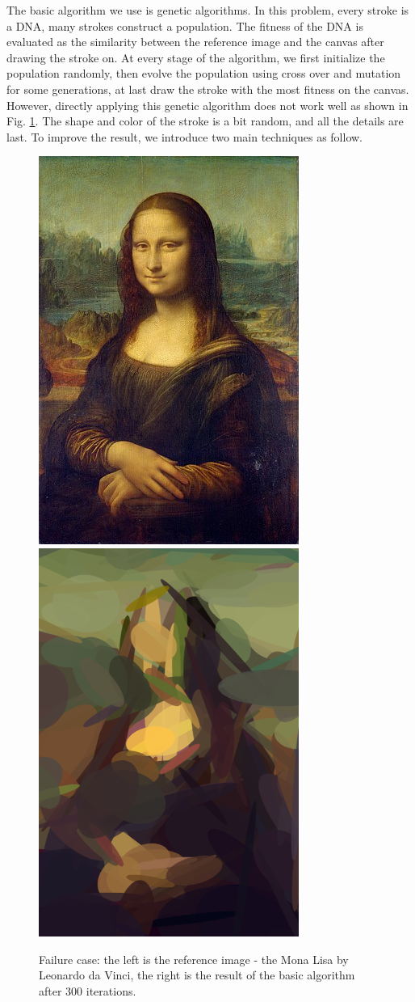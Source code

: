 \documentclass[a4paper,conference]{IEEEtran}
\begin{document}
The basic algorithm we use is genetic algorithms. In this problem, every stroke is a DNA, many strokes construct a population. The fitness of the DNA is evaluated as the similarity between the reference image and the canvas after drawing the stroke on. At every stage of the algorithm, we first initialize the population randomly, then evolve the population using cross over and mutation for some generations, at last draw the stroke with the most fitness on the canvas. However, directly applying this genetic algorithm does not work well as shown in Fig. \ref{fig:fail}. The shape and color of the stroke is a bit random, and all the details are last. To improve the result, we introduce two main techniques as follow.
\begin{figure}[htp]
  \centering
  \includegraphics[width=.4\columnwidth]{imgs/monalisa-322px.jpg}
  \includegraphics[width=.4\columnwidth]{imgs/failure-case.png}
  \caption{Failure case: the left is the reference image - the Mona Lisa by Leonardo da Vinci, the right is the result of the basic algorithm after 300 iterations.}
  \label{fig:fail}
\end{figure}
\end{document}

